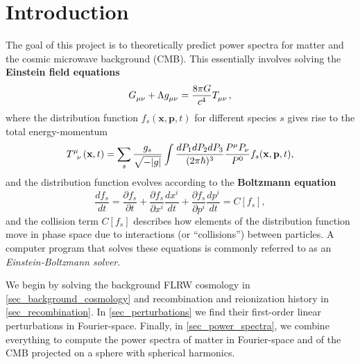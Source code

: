 \documentclass[10pt,a4paper]{article}
\begin{document}
\clearpage

\setcounter{section}{-1}
\section{Introduction}
\label{sec_intro}

The goal of this project is to theoretically predict
power spectra for matter and the cosmic microwave background (CMB).
This essentially involves solving the \textbf{Einstein field equations}
\begin{equation}
	G\indices{_\mu_\nu} + \Lambda g\indices{_\mu_\nu} = \frac{8 \pi G}{c^4} T\indices{_\mu_\nu},
\label{eq_einstein}
\end{equation}
where the distribution function $f_s(\mathbf{x},\mathbf{p},t)$ for different species $s$
gives rise to the total energy-momentum
\begin{equation}
	T\indices{^\mu_\nu}(\mathbf{x},t) = \sum_s \frac{g_s}{\sqrt{-|g|}} \int \frac{dP_1 dP_2 dP_3}{(2\pi\hbar)^3} \frac{P^\mu P_\nu}{P^0} f_s(\mathbf{x},\mathbf{p},t),
\label{eq_energy_momentum}
\end{equation}
and the distribution function evolves according to the \textbf{Boltzmann equation}
\begin{equation}
	\frac{df_s}{dt} = \frac{\partial f_s}{\partial t} + \frac{\partial f_s}{\partial x^i} \frac{dx^i}{dt} + \frac{\partial f_s}{\partial p^i} \frac{d p^i}{dt} = C[f_s],
\label{eq_boltzmann}
\end{equation}
and the collision term $C[f_s]$ describes how
elements of the distribution function move in phase space
due to interactions (or ``collisions'') between particles.
A computer program that solves these equations
is commonly referred to as an \emph{Einstein-Boltzmann solver}.

We begin by
solving the background FLRW cosmology in \cref{sec_background_cosmology}
and recombination and reionization history in \cref{sec_recombination}.
In \cref{sec_perturbations} we find their first-order linear perturbations in Fourier-space.
Finally, in \cref{sec_power_spectra}, we combine everything
to compute the power spectra of matter in Fourier-space
and of the CMB projected on a sphere with spherical harmonics.
\end{document}
